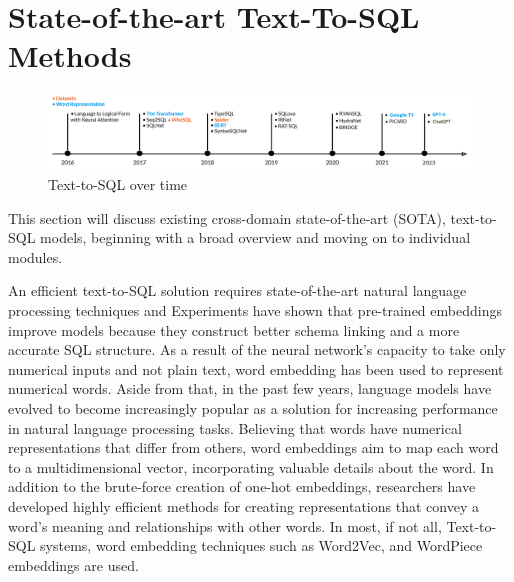 \section{State-of-the-art Text-To-SQL Methods}

\begin{figure}[H]
  \centering
  \includegraphics[width=1\textwidth]{pics/Timeline.png}
  \caption{\small Text-to-SQL over time}
  \label{fig:timeline}
\end{figure}

This section will discuss existing cross-domain state-of-the-art (SOTA), text-to-SQL models, beginning with a broad overview and moving on to individual modules. 

An efficient text-to-SQL solution requires state-of-the-art natural language processing techniques and Experiments have shown that pre-trained embeddings improve models because they construct better schema linking and a more accurate SQL structure. 
As a result of the neural network's capacity to take only numerical inputs and not plain text, word embedding has been used to represent numerical words.
Aside from that, in the past few years, language models have evolved to become increasingly popular as a solution for increasing performance in natural language processing tasks.
Believing that words have numerical representations that differ from others, word embeddings aim to map each word to a multidimensional vector, incorporating valuable details about the word. In addition to the brute-force creation of one-hot embeddings, researchers have developed highly efficient methods for creating representations that convey a word's meaning and relationships with other words. In most, if not all, Text-to-SQL systems, word embedding techniques such as Word2Vec\cite{DBLP:journals/corr/Rong14}, and WordPiece embeddings\cite{DBLP:journals/corr/WuSCLNMKCGMKSJL16} are used.

